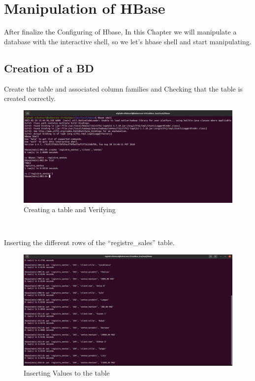 \chapter{Manipulation of HBase}
\par After finalize the Configuring of Hbase, In this Chapter we will manipulate a database with the interactive shell, so we let's hbase shell and start manipulating.
\\
\begin{spacing}{1.2}
\section{Creation of a BD }
\par Create the table and associated column families and Checking that the table is created correctly.
\\
\begin{figure}[!htb] 
\begin{center} 
\includegraphics[width=1\linewidth]{Pictures/HBase/Manipulation of HBase/Creation of a BD/Creating a table and Verifying .jpg} 
\end{center} 
\caption{Creating a table and Verifying } 
\end{figure}  \FloatBarrier
\\
\newpage

\par Inserting the different rows of the “registre\_sales” table.
\\
\begin{figure}[!htb] 
\begin{center} 
\includegraphics[width=1\linewidth]{Pictures/HBase/Manipulation of HBase/Creation of a BD/Inserting Values to the table} 
\end{center} 
\caption{Inserting Values to the table} 
\end{figure}  \FloatBarrier
\\


\end{spacing}
